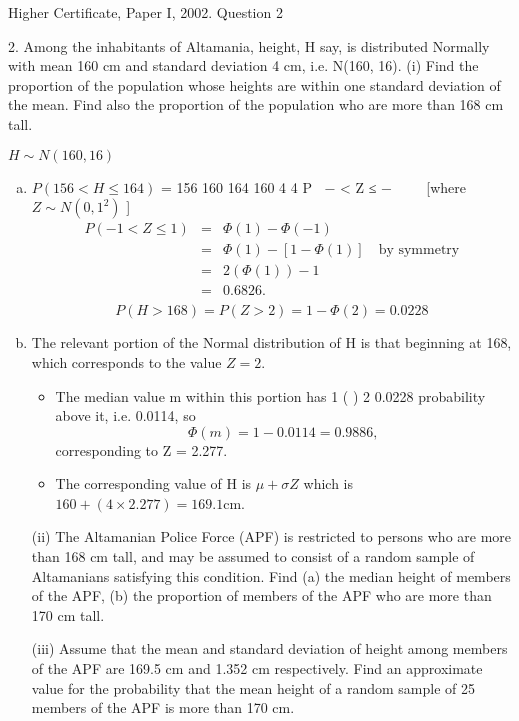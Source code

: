 \documentclass[a4paper,12pt]{article}
\begin{document}
Higher Certificate, Paper I, 2002. Question 2
\begin{framed}

2. Among the inhabitants of Altamania, height, H say, is distributed Normally with
mean 160 cm and standard deviation 4 cm, i.e. N(160, 16).
(i) Find the proportion of the population whose heights are within one
standard deviation of the mean. Find also the proportion of the population
who are more than 168 cm tall.


\end{framed}

$H \sim N(160,16)$


\begin{enumerate}[(a)]
\item  $P(156 < H \leq 164)$ = 156 160 164 160
4 4
P − < Z ≤ − 
 
[where $Z \sim N(0,1^2)$ ]
\begin{eqnarray*} 
P(−1< Z \leq 1) &=& \Phi(1) -\Phi(-1) \\&=& \Phi(1) -[1-\Phi(1)] \quad \mbox{by symmetry}\\
&=& 2(\Phi(1)) -1\\
&=& 0.6826.\\
\end{eqnarray*}
\[P(H >168) = P(Z > 2) =1-\Phi(2) = 0.0228\]
\item  The relevant portion of the Normal distribution of H is that beginning
at 168, which corresponds to the value $Z = 2$.
\begin{itemize}
    \item The median value m within this
portion has 1 ( )
2 0.0228 probability above it, i.e. 0.0114, so \[\Phi(m) =
1 − 0.0114 = 0.9886,\] corresponding to Z = 2.277. \item The corresponding value of
H is $μ +\sigma Z$ which is $160 + (4 \times 2.277) = 169.1 \mbox{cm}$.
\end{itemize}

\newpage

\begin{framed}

(ii) The Altamanian Police Force (APF) is restricted to persons who are more
than 168 cm tall, and may be assumed to consist of a random sample of
Altamanians satisfying this condition.
Find
(a) the median height of members of the APF,
(b) the proportion of members of the APF who are more than 170 cm
tall.

(iii) Assume that the mean and standard deviation of height among members of
the APF are 169.5 cm and 1.352 cm respectively. Find an approximate
value for the probability that the mean height of a random sample of 25
members of the APF is more than 170 cm.
\end{framed}


\end{enumerate}
\end{document}
